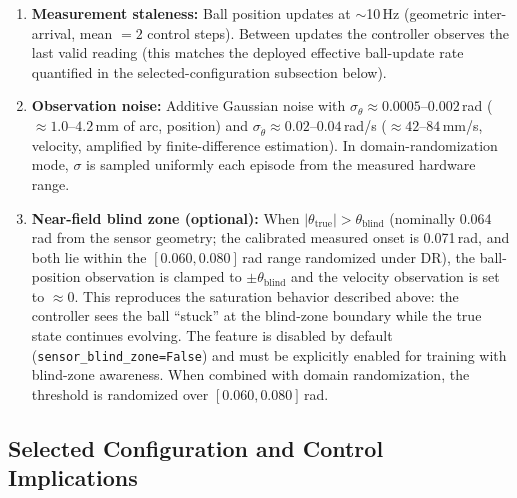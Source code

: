 \begin{enumerate}
  \item \textbf{Measurement staleness:} Ball position updates at
        $\sim$10\,Hz (geometric inter-arrival, mean $= 2$ control steps).
        Between updates the controller observes the last valid reading
        (this matches the deployed effective ball-update rate quantified
        in the selected-configuration subsection below).

  \item \textbf{Observation noise:} Additive Gaussian noise with
        $\sigma_\theta \approx 0.0005$--$0.002$\,rad
        ($\approx 1.0$--$4.2$\,mm of arc, position) and
        $\sigma_{\dot\theta} \approx 0.02$--$0.04$\,rad/s
        ($\approx 42$--$84$\,mm/s, velocity, amplified by
        finite-difference estimation).
        In domain-randomization mode, $\sigma$ is sampled uniformly
        each episode from the measured hardware range.

  \item \textbf{Near-field blind zone (optional):}
        When $|\theta_\text{true}| > \theta_\text{blind}$ (nominally
        0.064\,rad from the sensor geometry; the calibrated measured
        onset is 0.071\,rad, and both lie within the
        $[0.060, 0.080]$\,rad range randomized under DR), the
        ball-position observation is clamped to
        $\pm\theta_\text{blind}$ and the velocity observation is set
        to $\approx 0$.
        This reproduces the saturation behavior described above:
        the controller sees the ball ``stuck'' at the blind-zone boundary
        while the true state continues evolving.
        The feature is disabled by default
        (\texttt{sensor\_blind\_zone=False}) and must be explicitly
        enabled for training with blind-zone awareness. When combined
        with domain randomization, the threshold is randomized over
        $[0.060, 0.080]$\,rad.
\end{enumerate}

\subsection{Selected Configuration and Control Implications}

